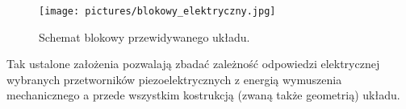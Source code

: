 \begin{figure}[htbp]
\centering
\texttt{[image: pictures/blokowy\_elektryczny.jpg]}
\caption{Schemat blokowy przewidywanego układu.}
\label{fig:electrical_scheme}
\end{figure}

\indent Tak ustalone założenia pozwalają zbadać zależność odpowiedzi 
elektrycznej wybranych przetworników piezoelektrycznych z energią wymuszenia mechanicznego 
a przede wszystkim kostrukcją (zwaną także geometrią) układu.